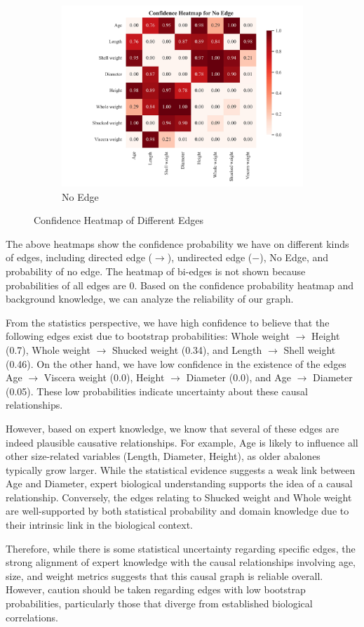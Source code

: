 \documentclass{article}
\begin{document}
\begin{figure}[H]
\begin{subfigure}{0.32\textwidth}
        \centering
        \includegraphics[width=\linewidth]{./demo_data/20241104_111650/Abalone/output_graph/non_existence_confidence_heatmap.jpg}
        \caption{No Edge}
    \end{subfigure}
    \caption{Confidence Heatmap of Different Edges}
\end{figure}        
The above heatmaps show the confidence probability we have on different kinds of edges, including directed edge ($\rightarrow$), undirected edge ($-$), No Edge, and probability of no edge. The heatmap of bi-edges is not shown because probabilities of all edges are 0. Based on the confidence probability heatmap and background knowledge, we can analyze the reliability of our graph.

From the statistics perspective, we have high confidence to believe that the following edges exist due to bootstrap probabilities: Whole weight $\rightarrow$ Height (0.7), Whole weight $\rightarrow$ Shucked weight (0.34), and Length $\rightarrow$ Shell weight (0.46). On the other hand, we have low confidence in the existence of the edges Age $\rightarrow$ Viscera weight (0.0), Height $\rightarrow$ Diameter (0.0), and Age $\rightarrow$ Diameter (0.05). These low probabilities indicate uncertainty about these causal relationships.

However, based on expert knowledge, we know that several of these edges are indeed plausible causative relationships. For example, Age is likely to influence all other size-related variables (Length, Diameter, Height), as older abalones typically grow larger. While the statistical evidence suggests a weak link between Age and Diameter, expert biological understanding supports the idea of a causal relationship. Conversely, the edges relating to Shucked weight and Whole weight are well-supported by both statistical probability and domain knowledge due to their intrinsic link in the biological context.

Therefore, while there is some statistical uncertainty regarding specific edges, the strong alignment of expert knowledge with the causal relationships involving age, size, and weight metrics suggests that this causal graph is reliable overall. However, caution should be taken regarding edges with low bootstrap probabilities, particularly those that diverge from established biological correlations.
\end{document}
